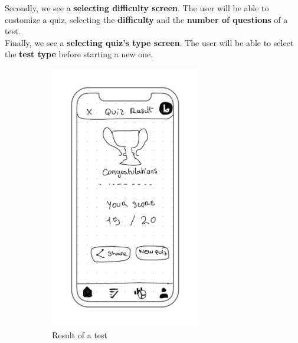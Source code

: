 Secondly, we see a \textbf{selecting difficulty screen}. The user will be able to customize a quiz, selecting the \textbf{difficulty} and the \textbf{number of questions} of a test. \\

Finally, we see a \textbf{selecting quiz's type screen}. The user will be able to select the \textbf{test type} before starting a new one. \\
\begin{figure}[H]
    \centering
    \begin{subfigure}[T]{0.32\textwidth}
        \centering
        \includegraphics[width=0.72\textwidth]{assets/screens/quiz/common/Quiz - Result.png}
        \caption{Result of a test}
        \label{fig:design_screen_result}
    \end{subfigure}
    \hfill
    \begin{subfigure}[T]{0.33\textwidth}
        \centering

\end{subfigure}
\end{figure}
